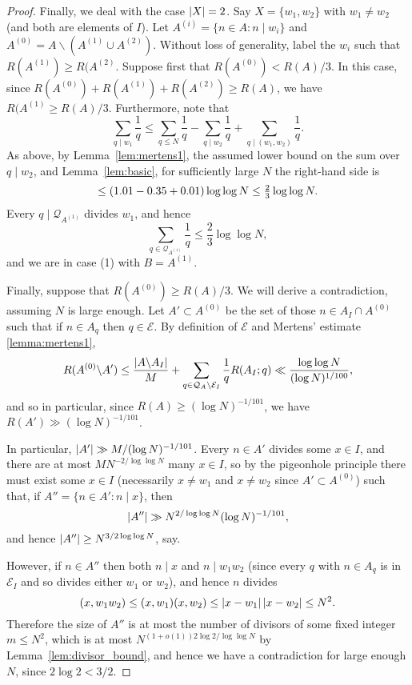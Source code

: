 \begin{proof}
Finally, we deal with the case $\left\lvert X\right\rvert=2$. Say $X=\{w_1,w_2\}$ with $w_1\neq w_2$ (and both are elements of $I$). Let $A^{(i)}=\{n\in A: n\mid w_i\}$ and $A^{(0)}=A\backslash (A^{(1)}\cup A^{(2)})$. Without loss of generality, label the $w_i$ such that $R(A^{(1)})\geq R(A^{(2)}$.  Suppose first that $R(A^{(0)})<R(A)/3$. In this case, since $R(A^{(0)})+R(A^{(1)})+R(A^{(2)})\geq R(A)$, we have $R(A^{(1)}\geq R(A)/3$. Furthermore, note that
\[\sum_{q\mid w_1}\frac{1}{q}\leq \sum_{q\leq N}\frac{1}{q}-\sum_{q\mid w_2}\frac{1}{q}+\sum_{q\mid (w_1,w_2)}\frac{1}{q}.\]
As above, by Lemma~\ref{lem:mertens1}, the assumed lower bound on the sum over $q\mid w_2$, and Lemma~\ref{lem:basic}, for sufficiently large $N$ the right-hand side is 
\[\leq \left( 1.01-0.35+0.01\right)\log\log N\leq \tfrac{2}{3}\log\log N.\]
Every $q\mid \mathcal{Q}_{A^{(1)}}$ divides $w_1$, and hence 
\[\sum_{q\in \mathcal{Q}_{A^{(1)}}}\frac{1}{q}\leq\frac{2}{3}\log\log N,\]
and we are in case (1) with $B=A^{(1)}$. 

Finally, suppose that $R(A^{(0)})\geq R(A)/3$. We will derive a contradiction, assuming $N$ is large enough.  Let $A'\subset A^{(0)}$ be the set of those $n\in A_I\cap A^{(0)}$ such that if $n\in A_q$ then $q\in\mathcal{E}$. By definition of $\mathcal{E}$ and Mertens' estimate \ref{lemma:mertens1},
  \[R(A^{(0)}\backslash A')\leq \frac{\left\lvert A\backslash A_I\right\rvert}{M}+\sum_{q\in\mathcal{Q}_A\backslash \mathcal{E}_I}\frac{1}{q}R(A_I;q)\ll \frac{\log\log N}{(\log N)^{1/100}},\]
  and so  in particular, since $R(A)\geq (\log N)^{-1/101}$, we have $R(A')\gg (\log N)^{-1/101}$.

  In particular, $\left\lvert A'\right\rvert\gg M/(\log N)^{-1/101}$. Every $n\in A'$ divides some $x\in I$, and there are at most $MN^{-2/\log\log N}$ many $x\in I$, so by the pigeonhole principle there must exist some $x\in I$ (necessarily $x\neq w_1$ and $x\neq w_2$ since $A'\subset A^{(0)}$) such that, if $A''=\{ n\in A' : n\mid x\}$, then
  \[\left\lvert A''\right\rvert\gg N^{2/\log\log N}(\log N)^{-1/101},\]
  and hence $\left\lvert A''\right\rvert\geq N^{3/2\log\log N}$, say.

  However, if $n\in A''$ then both $n\mid x$ and $n\mid w_1w_2$ (since every $q$ with $n\in A_q$ is in $\mathcal{E}_I$ and so divides either $w_1$ or $w_2$), and hence $n$ divides
  \[(x,w_1w_2)\leq (x,w_1)(x,w_2)\leq \left\lvert x-w_1\right\rvert\left\lvert x-w_2\right\rvert\leq N^2.\]
  Therefore the size of $A''$ is at most the number of divisors of some fixed integer $m\leq N^2$, which is at most $N^{(1+o(1))2\log 2/\log\log N}$ by Lemma~\ref{lem:divisor_bound}, and hence we have a contradiction for large enough $N$, since $2\log 2< 3/2$.
\end{proof}

